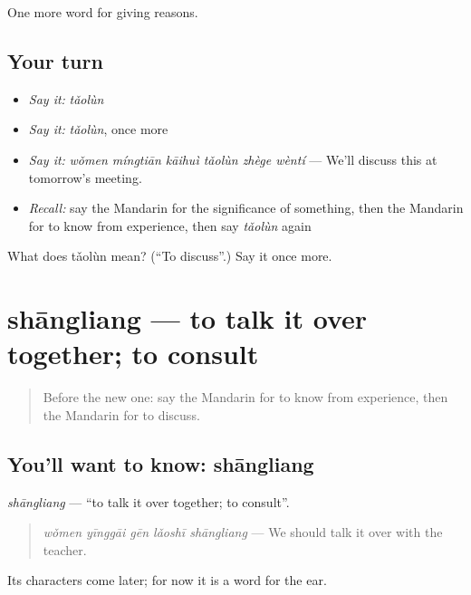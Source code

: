 \begin{grammarlens}[title={What you've built}]
One more word for giving reasons.
\end{grammarlens}

\subsection*{Your turn}
\begin{itemize}
\raggedright
  \item \emph{Say it:} \emph{tǎolùn}
  \item \emph{Say it:} \emph{tǎolùn}, once more
  \item \emph{Say it:} \emph{wǒmen míngtiān kāihuì tǎolùn zhège wèntí} — We'll discuss this at tomorrow's meeting.
  \item \emph{Recall:} say the Mandarin for the significance of something, then the Mandarin for to know from experience, then say \emph{tǎolùn} again
\end{itemize}

\begin{tcolorbox}[breakable,colback=teal!4,colframe=teal!35!black,title={Before you move on}]
What does tǎolùn mean? (\textquotedblleft{}To discuss\textquotedblright{}.) Say it once more.
\end{tcolorbox}
\section[shāngliang]{shāngliang — to talk it over together; to consult}

\label{lesson:ZH-C348-shangliang}



\begin{quote}
Before the new one: say the Mandarin for to know from experience, then the Mandarin for to discuss.
\end{quote}

\subsection*{You'll want to know: shāngliang}
\emph{shāngliang} — \textquotedblleft{}to talk it over together; to consult\textquotedblright{}.

\begin{quote}
\emph{wǒmen yīnggāi gēn lǎoshī shāngliang} — We should talk it over with the teacher.
\end{quote}

Its characters come later; for now it is a word for the ear.

